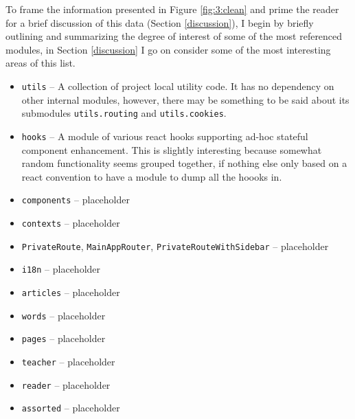 \documentclass{article}
\begin{document}
To frame the information presented in Figure \ref{fig:3:clean} and prime the reader 
for a brief discussion of this data (Section \ref{discussion}),
I begin by briefly outlining and summarizing the degree of interest of some of the most referenced modules,
in Section \ref{discussion} I go on consider some of the most interesting areas of this list.

\begin{itemize}
  \item \verb|utils| -- A collection of project local utility code.
                        It has no dependency on other internal modules, 
                        however, 
                        there may be something to be said about
                        its submodules \verb|utils.routing| and \verb|utils.cookies|.
  \item \verb|hooks| -- A module of various react hooks supporting ad-hoc stateful component enhancement.
                        This is slightly interesting because somewhat random functionality seems grouped together,
                        if nothing else only based on a react convention to have a module to dump all the hoooks in.
  \item \verb|components| -- placeholder
  \item \verb|contexts| -- placeholder
  \item \verb|PrivateRoute|, \verb|MainAppRouter|, \verb|PrivateRouteWithSidebar| -- placeholder
  \item \verb|i18n| -- placeholder
  \item \verb|articles| -- placeholder
  \item \verb|words| -- placeholder
  \item \verb|pages| -- placeholder
  \item \verb|teacher| -- placeholder
  \item \verb|reader| -- placeholder
  \item \verb|assorted| -- placeholder
\end{itemize}


\end{document}
